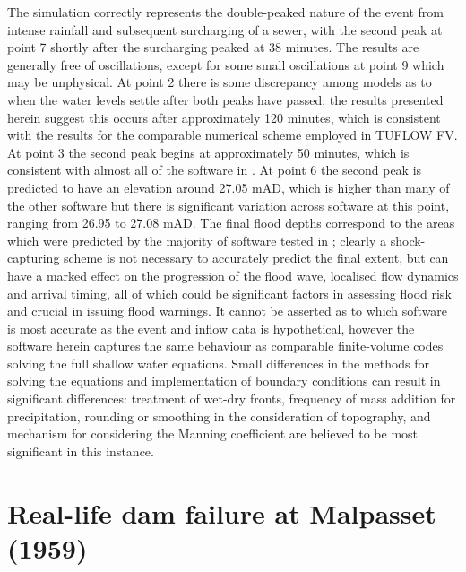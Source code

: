 The simulation correctly represents the double-peaked nature of the event from intense rainfall and subsequent surcharging of a sewer, with the second peak at point 7 shortly after the surcharging peaked at 38 minutes. The results are generally free of oscillations, except for some small oscillations at point 9 which may be unphysical. At point 2 there is some discrepancy among models as to when the water levels settle after both peaks have passed; the results presented herein suggest this occurs after approximately 120 minutes, which is consistent with the results for the comparable numerical scheme employed in TUFLOW FV. At point 3 the second peak begins at approximately 50 minutes, which is consistent with almost all of the software in \citet{Pender2013}. At point 6 the second peak is predicted to have an elevation around 27.05 mAD, which is higher than many of the other software but there is significant variation across software at this point, ranging from 26.95 to 27.08 mAD. The final flood depths correspond to the areas which were predicted by the majority of software tested in \citet{Pender2013}; clearly a shock-capturing scheme is not necessary to accurately predict the final extent, but can have a marked effect on the progression of the flood wave, localised flow dynamics and arrival timing, all of which could be significant factors in assessing flood risk and crucial in issuing flood warnings. It cannot be asserted as to which software is most accurate as the event and inflow data is hypothetical, however the software herein captures the same behaviour as comparable finite-volume codes solving the full shallow water equations. Small differences in the methods for solving the equations and implementation of boundary conditions can result in significant differences: treatment of wet-dry fronts, frequency of mass addition for precipitation, rounding or smoothing in the consideration of topography, and mechanism for considering the Manning coefficient are believed to be most significant in this instance.

\section{Real-life dam failure at Malpasset (1959)}


